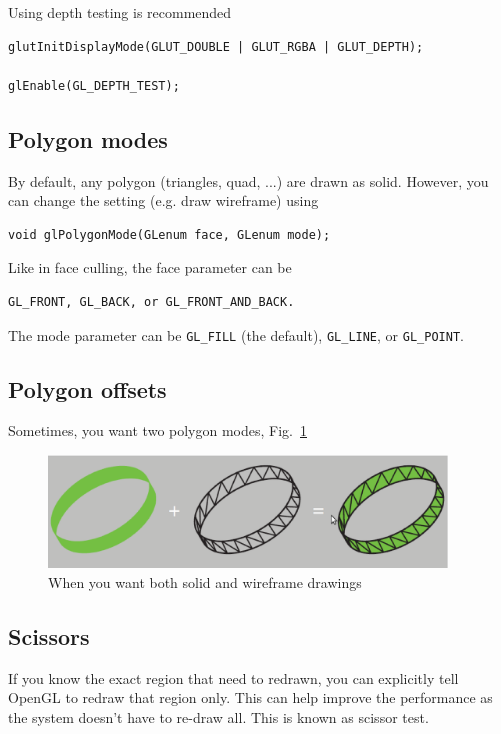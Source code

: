 Using depth testing is recommended
\begin{verbatim}
glutInitDisplayMode(GLUT_DOUBLE | GLUT_RGBA | GLUT_DEPTH);

glEnable(GL_DEPTH_TEST);
\end{verbatim}

\subsection{Polygon modes}
\label{sec:polygon-modes}

By default, any polygon (triangles, quad, ...) are drawn as
solid. However, you can change the setting (e.g. draw wireframe) using
\begin{verbatim}
void glPolygonMode(GLenum face, GLenum mode);
\end{verbatim}
Like in face culling, the face parameter can be 
\begin{verbatim}
GL_FRONT, GL_BACK, or GL_FRONT_AND_BACK.
\end{verbatim}
The mode parameter can be \verb!GL_FILL! (the default),
\verb!GL_LINE!, or \verb!GL_POINT!. 

\subsection{Polygon offsets}
\label{sec:polygon-offsets}

Sometimes, you want two polygon modes, Fig.~\ref{fig:polygon_offset}

\begin{figure}[hbt]
  \centerline{\includegraphics[height=3cm,
    angle=0]{./images/polygon_offset.eps}}
  \caption{When you want both solid and wireframe drawings}
  \label{fig:polygon_offset}
\end{figure}


\subsection{Scissors }
\label{sec:scissors-}

If you know the exact region that need to redrawn, you can explicitly
tell OpenGL to redraw that region only. This can help improve the
performance as the system doesn't have to re-draw all. This is known
as scissor test.

